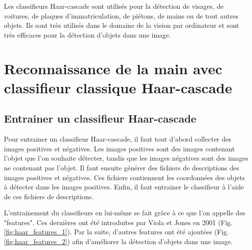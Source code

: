 \documentclass[11pt]{article}
\begin{document}
Les classifieurs Haar-cascade sont utilisés pour la détection de visages, de voitures, de plaques d'immatriculation, de piétons, de mains ou de tout autres objets. Ils sont très utilisés dans le domaine de la vision par ordinateur et sont très efficaces pour la détection d'objets dans une image. \bigbreak



\newpage

\section{Reconnaissance de la main avec classifieur classique Haar-cascade}
\subsection{Entrainer un classifieur Haar-cascade}
Pour entrainer un classifieur Haar-cascade, il faut tout d'abord collecter des images positives et négatives. Les images positives sont des images contenant l'objet que l'on souhaite détecter, tandis que les images négatives sont des images ne contenant pas l'objet. Il faut ensuite générer des fichiers de descriptions des images positives et négatives. Ces fichiers contiennent les coordonnées des objets à détecter dans les images positives. Enfin, il faut entrainer le classifieur à l'aide de ces fichiers de descriptions. \bigbreak

L'entrainement du classifieurs en lui-même se fait grâce à ce que l'on appelle des "features". Ces dernières ont été introduites par Viola et Jones en 2001 (Fig. \ref{fig:haar_features_1}). Par la suite, d'autres features ont été ajoutées (Fig. \ref{fig:haar_features_2}) afin d'améliorer la détection d'objets dans une image.
\bigbreak \bigbreak
\end{document}
